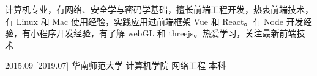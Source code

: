 \documentclass[zh]{resume}
\begin{document}
\makeheader

{\onehalfspacing\hspace{2em}%
计算机专业，有网络、安全学与密码学基础，擅长前端工程开发，热衷前端技术，有 Linux 和 Mac 使用经验，实践应用过前端框架 Vue 和 React。有 Node 开发经验，有小程序开发经验，有了解 webGL 和 threejs。热爱学习，关注最新前端技术
\par}


\begin{educations}
  \education%
    {2015.09}%
    [2019.07]%
    {华南师范大学}%
    {计算机学院}%
    {网络工程}%
    {本科}
\end{educations}
\end{document}
